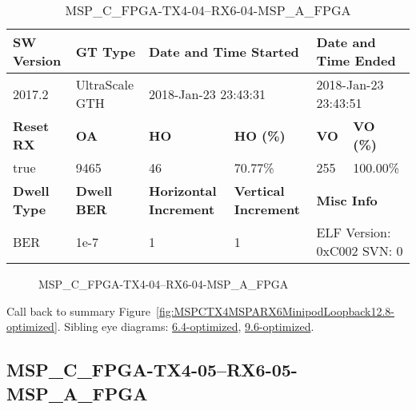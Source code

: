 \begin{table}[h]
\centering
\caption{MSP\_C\_FPGA-TX4-04--RX6-04-MSP\_A\_FPGA}
\label{tab:MSPCFPGATX404RX604MSPAFPGA12.8-optimized}
\begin{tabular}{@{}|l|l|l|l|l|l|@{}}
\toprule
\textbf{SW Version}                & \textbf{GT Type}   & \multicolumn{2}{l|}{\textbf{Date and Time Started}}            & \multicolumn{2}{l|}{\textbf{Date and Time Ended}}        \\ \midrule
2017.2                       & UltraScale GTH          & \multicolumn{2}{l|}{2018-Jan-23 23:43:31}                   & \multicolumn{2}{l|}{2018-Jan-23 23:43:51}               \\ \midrule
\textbf{Reset RX}                  & \textbf{OA} & \textbf{HO}   & \textbf{HO (\%)} & \textbf{VO} & \textbf{VO (\%)} \\ \midrule
true & 9465        & 46          & 70.77\%        & 255        & 100.00\%       \\ \midrule
\textbf{Dwell Type}                & \textbf{Dwell BER} & \textbf{Horizontal Increment} & \textbf{Vertical Increment}    & \multicolumn{2}{l|}{\textbf{Misc Info}}                  \\ \midrule
BER                            & 1e-7        & 1        & 1           & \multicolumn{2}{l|}{ELF Version: 0xC002 SVN: 0}                         \\ \bottomrule
\end{tabular}
\end{table}

\begin{figure}[h]
\caption{MSP\_C\_FPGA-TX4-04--RX6-04-MSP\_A\_FPGA} \label{fig:MSPCFPGATX404RX604MSPAFPGA12.8-optimized}
\end{figure}

Call back to summary Figure~\ref{fig:MSPCTX4MSPARX6MinipodLoopback12.8-optimized}.
Sibling eye diagrams: \hyperref[sec:MSPCFPGATX404RX604MSPAFPGA6.4-optimized]{6.4-optimized}, \hyperref[sec:MSPCFPGATX404RX604MSPAFPGA9.6-optimized]{9.6-optimized}.

\clearpage
\newpage


\subsection{MSP\_C\_FPGA-TX4-05--RX6-05-MSP\_A\_FPGA}\label{sec:MSPCFPGATX405RX605MSPAFPGA12.8-optimized}

